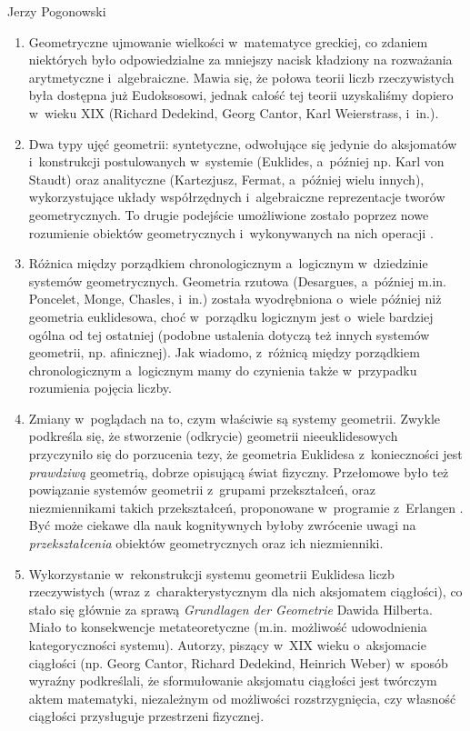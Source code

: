 \begin{newrevplenv}{Jerzy Pogonowski}
\begin{enumerate}

\item Geometryczne ujmowanie wielkości w~matematyce greckiej, co
zdaniem niektórych było odpowiedzialne za mniejszy nacisk
kładziony na rozważania arytmetyczne i~algebraiczne. Mawia się, że
połowa teorii liczb rzeczywistych była dostępna już Eudoksosowi,
jednak całość tej teorii uzyskaliśmy dopiero w~wieku XIX (Richard
Dedekind, Georg Cantor, Karl Weierstrass, i~in.).

\item Dwa typy ujęć geometrii: syntetyczne, odwołujące się jedynie
do aksjomatów i~konstrukcji postulowanych w~systemie (Euklides, a~później np. Karl von Staudt) oraz analityczne (Kartezjusz, Fermat,
a~później wielu innych), wykorzystujące układy współrzędnych i~algebraiczne reprezentacje tworów geometrycznych. To drugie
podejście umożliwione zostało poprzez nowe rozumienie obiektów
geometrycznych i~wykonywanych na nich operacji \parencite{descartes_geometria_2015}.

\item Różnica między porządkiem chronologicznym a~logicznym w~dziedzinie systemów geometrycznych. Geometria rzutowa (Desargues,
a~później m.in. Poncelet, Monge, Chasles, i~in.) została
wyodrębniona o~wiele później niż geometria euklidesowa, choć w~porządku logicznym jest o~wiele bardziej ogólna od tej ostatniej
(podobne ustalenia dotyczą też innych systemów geometrii, np.
afinicznej). Jak wiadomo, z~różnicą między porządkiem
chronologicznym a~logicznym mamy do czynienia także w~przypadku
rozumienia pojęcia liczby.

\item Zmiany w~poglądach na to, czym właściwie są systemy
geometrii. Zwykle podkreśla się, że stworzenie (odkrycie)
geometrii nieeuklidesowych przyczyniło się do porzucenia tezy, że
geometria Euklidesa z~konieczności jest {\em prawdziwą} geometrią,
dobrze opisującą świat fizyczny. Przełomowe było też powiązanie
systemów geometrii z~grupami przekształceń, oraz niezmiennikami
takich przekształceń, proponowane w~programie z~Erlangen \parencite{klein_vergleichende_1872}. Być może ciekawe dla nauk kognitywnych byłoby zwrócenie
uwagi na {\em przekształcenia} obiektów geometrycznych oraz ich
niezmienniki.

\item Wykorzystanie w~rekonstrukcji systemu geometrii Euklidesa
liczb rzeczywistych (wraz z~charakterystycznym dla nich aksjomatem
ciągłości), co stało się głównie za sprawą {\em Grundlagen der
Geometrie} \parencite*{hilbert_grundlagen_1899} Dawida Hilberta. Miało to konsekwencje
metateoretyczne (m.in. możliwość udowodnienia kategoryczności
systemu). Autorzy, piszący w~XIX wieku o~aksjomacie ciągłości (np.
Georg Cantor, Richard Dedekind, Heinrich Weber) w~sposób wyraźny
podkreślali, że sformułowanie aksjomatu ciągłości jest twórczym
aktem matematyki, niezależnym od możliwości rozstrzygnięcia, czy
własność ciągłości przysługuje przestrzeni fizycznej.


\end{enumerate}
\end{newrevplenv}
